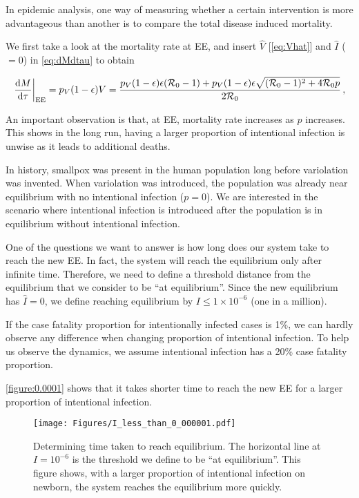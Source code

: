 \documentclass[12pt]{article}
\newcommand\dbyd[2]{\frac{\mathrm d{#1}}{\mathrm d{#2}}}
\newcommand{\R}{\mathcal{R}}
\newcommand{\pmV}{p_{V}}
\begin{document}
In epidemic analysis, one way of measuring whether a certain intervention is more advantageous than another is to compare the total disease induced mortality. 

We first take a look at the mortality rate at EE, and insert $\hat{V}$ [\autoref{eq:Vhat}]
and $\hat{I}$ ($=0$) in \autoref{eq:dMdtau} to obtain
\begin{linenomath*}
\begin{equation}
\left. \dbyd{M}{\tau}\right|_{\rm EE}=\pmV(1-\epsilon)V=\frac{\pmV(1-\epsilon)\epsilon(\R_0 -1)+ \pmV(1-\epsilon)\epsilon \sqrt{(\R_0-1)^2+4\R_0 p}}{2\R_0}\,, \label{eq:dMdt}
\end{equation}
\end{linenomath*}

An important observation is that, at EE, mortality rate increases as $p$ increases. This shows in the long run, having a larger proportion of intentional infection is unwise as it leads to additional deaths.

In history, smallpox was present in the human population long before variolation was invented. When variolation was introduced, the population was already near equilibrium with no intentional infection ($p=0$). We are interested in the scenario where intentional infection is introduced after the population is in equilibrium without intentional infection.

One of the questions we want to answer is how long does our system take to reach the new EE. In fact, the system will reach the equilibrium only after infinite time.  Therefore, we need to define a threshold distance from the equilibrium that we consider to be ``at equilibrium''.
Since the new equilibrium has $\hat{I}=0$, we define reaching equilibrium by $I\leq 1\times 10^{-6}$ (one in a million).

If the case fatality proportion for intentionally infected cases is 1\%, we can hardly observe any difference when changing proportion of intentional infection. To help us observe the dynamics, we assume intentional infection has a 20\% case fatality proportion.

\autoref{figure:0.0001} shows that it takes shorter time to reach the new EE for a larger proportion of intentional infection.
\begin{figure}[h]
  \centering
  \texttt{[image: Figures/I\_less\_than\_0\_000001.pdf]}
  \caption{Determining time taken to reach equilibrium.  The horizontal line at $I=10^{-6}$ is the threshold we define to be ``at equilibrium''. This figure shows, with a larger proportion of intentional infection on newborn, the system reaches the equilibrium more quickly.}
\label{figure:0.0001}
\end{figure}
\end{document}

